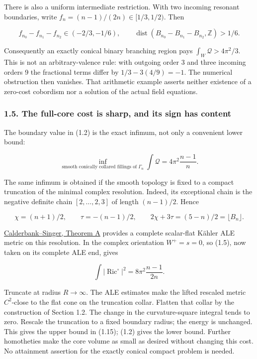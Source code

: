 \documentclass[
  10pt,
]{article}
\begin{document}
There is also a uniform intermediate restriction. With two incoming
resonant boundaries, write \(f_n=(n-1)/(2n)\in[1/3,1/2)\). Then

\[
 f_{n_0}-f_{n_1}-f_{n_2}\in(-2/3,-1/6),\qquad
 \operatorname{dist}(B_{n_0}-B_{n_1}-B_{n_2},\mathbb Z)>1/6.
\]

Consequently an exactly conical binary branching region pays
\(\int_W\mathscr Q>4\pi^2/3\). This is not an arbitrary-valence rule:
with outgoing order 3 and three incoming orders 9 the fractional terms
differ by \(1/3-3(4/9)=-1\). The numerical obstruction then vanishes.
That arithmetic example asserts neither existence of a zero-cost
cobordism nor a solution of the actual field equations.

\hypertarget{the-full-core-cost-is-sharp-and-its-sign-has-content}{%
\subsubsection{1.5. The full-core cost is sharp, and its sign has
content}\label{the-full-core-cost-is-sharp-and-its-sign-has-content}}

The boundary value in (1.2) is the exact infimum, not only a convenient
lower bound:

\[
 \boxed{\inf_{\text{smooth conically collared fillings of }\Gamma_n}
                   \int\mathscr Q=4\pi^2\frac{n-1}{n}.}        \tag{1.15}
\]

The same infimum is obtained if the smooth topology is fixed to a
compact truncation of the minimal complex resolution. Indeed, its
exceptional chain is the negative definite chain \([2,\ldots,2,3]\) of
length \((n-1)/2\). Hence

\[
 \chi=(n+1)/2,\qquad \tau=-(n-1)/2,\qquad
                 2\chi+3\tau=(5-n)/2=\lfloor B_n\rfloor.
\]

\href{https://arxiv.org/pdf/math/0206229}{Calderbank--Singer, Theorem A}
provides a complete scalar-flat Kähler ALE metric on this resolution. In
the complex orientation \(W^+=s=0\), so (1.5), now taken on its complete
ALE end, gives

\[
 \int|\operatorname{Ric}^{\circ}|^2
                 =8\pi^2\frac{n-1}{2n}.             \tag{1.16}
\]

Truncate at radius \(R\to\infty\). The ALE estimates make the lifted
rescaled metric \(C^2\)-close to the flat cone on the truncation collar.
Flatten that collar by the construction of Section 1.2. The change in
the curvature-square integral tends to zero. Rescale the truncation to a
fixed boundary radius; the energy is unchanged. This gives the upper
bound in (1.15); (1.2) gives the lower bound. Further homotheties make
the core volume as small as desired without changing this cost. No
attainment assertion for the exactly conical compact problem is needed.
\end{document}
